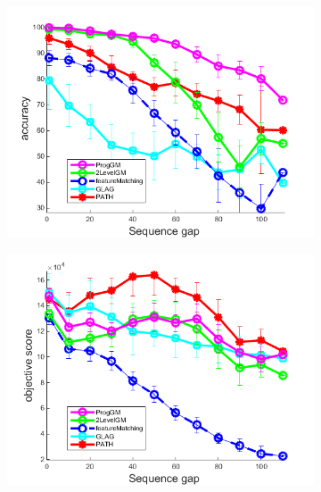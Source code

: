 \begin{figure}[h] \centering
		\begin{subfigure}[b]{0.33\textwidth}
			\centering
			\includegraphics[scale=0.25]{"chapter3/fig/HouseSeq2/anchor_descr/using_cpd_afftrafo/ext_solution2/performance/accuracy"} 
		\end{subfigure} 
		\begin{subfigure}[b]{0.33\textwidth}
			\centering
			\includegraphics[scale=0.25]{"chapter3/fig/HouseSeq2/anchor_descr/using_cpd_afftrafo/ext_solution2/performance/score"} 
		\end{subfigure}
		\begin{subfigure}[b]{0.32\textwidth}
			\centering

\end{subfigure}
\end{figure}
